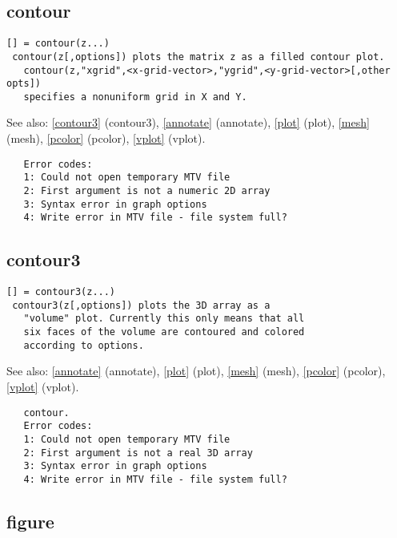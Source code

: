 \documentclass[a4paper]{article}
\begin{document}
\subsection{contour\label{contour}}

\begin{tscreen}
\begin{verbatim}
[] = contour(z...)
 contour(z[,options]) plots the matrix z as a filled contour plot.
   contour(z,"xgrid",<x-grid-vector>,"ygrid",<y-grid-vector>[,other opts])
   specifies a nonuniform grid in X and Y.
\end{verbatim}

See also: \ref{contour3} {(contour3)}, \ref{annotate} {(annotate)}, \ref{plot} {(plot)}, \ref{mesh} {(mesh)}, \ref{pcolor} {(pcolor)}, \ref{vplot} {(vplot)}.
\begin{verbatim}
   Error codes:
   1: Could not open temporary MTV file
   2: First argument is not a numeric 2D array
   3: Syntax error in graph options
   4: Write error in MTV file - file system full? 
\end{verbatim}
\end{tscreen}



\subsection{contour3\label{contour3}}

\begin{tscreen}
\begin{verbatim}
[] = contour3(z...)
 contour3(z[,options]) plots the 3D array as a
   "volume" plot. Currently this only means that all
   six faces of the volume are contoured and colored
   according to options.
\end{verbatim}

See also: \ref{annotate} {(annotate)}, \ref{plot} {(plot)}, \ref{mesh} {(mesh)}, \ref{pcolor} {(pcolor)}, \ref{vplot} {(vplot)}.
\begin{verbatim}
   contour.
   Error codes:
   1: Could not open temporary MTV file
   2: First argument is not a real 3D array
   3: Syntax error in graph options
   4: Write error in MTV file - file system full? 
\end{verbatim}
\end{tscreen}



\subsection{figure\label{figure}}
\end{document}
